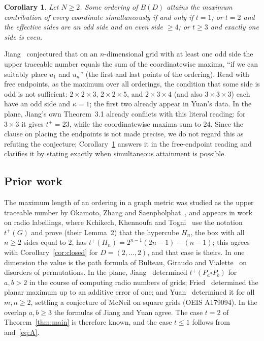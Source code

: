 \documentclass[11pt]{article}
\newtheorem{corollary}{Corollary}
\theoremstyle{remark}
\begin{document}
\begin{corollary}\label{cor:simul}
Let $N\ge2$. Some ordering of $B(D)$ attains the maximum contribution of every
coordinate simultaneously if and only if $t=1$; or $t=2$ and the effective
sides are an odd side and an even side $\ge4$; or $t\ge3$ and exactly one side
is even.
\end{corollary}

Jiang~\cite[Section~7]{jiang} conjectured that on an $n$-dimensional grid with
at least one odd side the upper traceable number equals the sum of the
coordinatewise maxima, ``if we can suitably place $u_1$ and $u_n$'' (the first
and last points of the ordering). Read with
free endpoints, as the maximum over all orderings, the condition that some
side is odd is not sufficient: $2\times2\times3$, $2\times2\times5$,
and $2\times3\times4$ (and also $3\times3\times3$) each have an odd side
and $\kappa=1$; the first two already appear in Yuan's data. In the plane,
Jiang's own Theorem~3.1 already conflicts with this literal reading: for
$3\times3$ it gives $t^+=23$, while the coordinatewise maxima sum to $24$.
Since the clause on placing the endpoints is not made precise, we do not regard this as refuting
the conjecture; Corollary~\ref{cor:simul} answers it in the free-endpoint
reading and clarifies it by stating exactly when simultaneous attainment is
possible.

\subsection*{Prior work}

The maximum length of an ordering in a graph metric was studied as the upper
traceable number by Okamoto, Zhang and Saenpholphat~\cite{osz}, and appears in
work on radio labellings, where Kchikech, Khennoufa and Togni~\cite{kkt} use
the notation $t^+(G)$ and prove (their Lemma~2) that the hypercube $H_n$, the box with all
$n\ge2$ sides equal to $2$, has $t^+(H_n)=2^{n-1}(2n-1)-(n-1)$; this agrees with
Corollary~\ref{cor:closed} for $D=(2,\dots,2)$, and that case is theirs. In one
dimension the value is the path formula of Bulteau, Giraudo and
Vialette~\cite[Theorem~8]{bgv} on disorders of permutations. In the plane, Jiang~\cite[Theorem~3.1]{jiang} determined
$t^+(P_a\square P_b)$ for $a,b>2$ in the course of computing radio numbers of
grids; Fried~\cite{fried} determined the planar maximum up to an additive error
of one; and Yuan~\cite[Theorem~1.1]{yuan} determined it for all $m,n\ge2$,
settling a conjecture of McNeil on square grids (OEIS A179094). In the
overlap $a,b\ge3$ the formulas of Jiang and Yuan agree. The case $t=2$ of
Theorem~\ref{thm:main} is therefore known, and the case $t\le1$ follows
from~\cite{bgv} and~\eqref{eq:A}.
\end{document}

